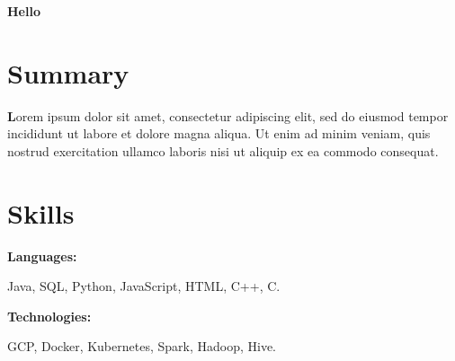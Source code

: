 \documentclass[letterpaper,9pt]{article}
\newcommand{\font}[1]{{\fontfamily{phv}\selectfont #1}}
\begin{document}
    
  \begin{minipage}[b]{0.5\textwidth} 
  \vspace{-\baselineskip} 
  \textbf{\font{Hello}}
      
  \end{minipage}
  \vspace*{7mm}
     
    \begin{minipage}[t]{0.46\textwidth}
    \section{\textbf{Summary}}
	\textbf Lorem ipsum dolor sit amet, consectetur adipiscing elit, sed do eiusmod tempor incididunt ut labore et dolore magna aliqua. 
    Ut enim ad minim veniam, quis nostrud exercitation ullamco laboris nisi ut aliquip ex ea commodo consequat.  \\
\end{minipage}
\hfill
\begin{minipage}[t]{0.46\textwidth}
\section{\textbf{Skills}}
    
    
    \begin{minipage}[t]{0.2\textwidth}
        \textbf{Languages:}
    \end{minipage}
    \hfill
    \begin{minipage}[t]{0.73\textwidth}
      Java, SQL, Python, JavaScript, HTML, C++, C.  
    \end{minipage}
    \vspace{4mm}
    
    \begin{minipage}[t]{0.2\textwidth}
        \textbf{Technologies:}
    \end{minipage}
    \hfill
    \begin{minipage}[t]{0.73\textwidth}
      GCP, Docker, Kubernetes, Spark, Hadoop, Hive.
    \end{minipage}
    
\end{minipage}
    
\end{document}
